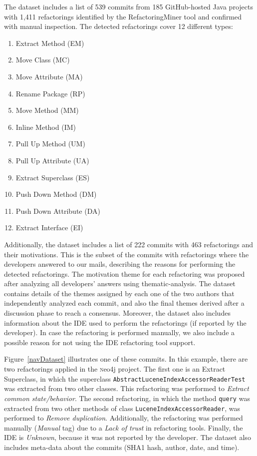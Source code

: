 The dataset includes a list of 539 commits from 185 GitHub-hosted Java projects with 1,411 refactorings identified by the RefactoringMiner tool and confirmed with manual inspection. The detected refactorings cover 12 different types:
\begin{enumerate}
	\item Extract Method (EM)
	\item Move Class (MC)
	\item Move Attribute (MA)
	\item Rename Package (RP)
	\item Move Method (MM)
	\item Inline Method (IM)
	\item Pull Up Method (UM)
	\item Pull Up Attribute (UA)
	\item Extract Superclass (ES)
	\item Push Down Method (DM)
	\item Push Down Attribute (DA)
	\item Extract Interface (EI)
\end{enumerate}


Additionally, the dataset includes a list of 222 commits with 463 refactorings and their motivations.
This is the subset of the commits with refactorings where the developers answered to our mails, describing the reasons for performing the detected refactorings. The motivation theme for each refactoring was proposed after analyzing all developers' answers using thematic-analysis. The dataset contains details of the themes assigned by each one of the two authors that independently analyzed each commit, and also the final themes derived after a discussion phase to reach a consensus.
Moreover, the dataset also includes information about the IDE used to perform the refactorings (if reported by the developer). In case the refactoring is performed manually, we also include a possible reason for not using the IDE refactoring tool support.


Figure~\ref{navDataset} illustrates one of these commits. 
In this example, there are two refactorings applied in the {\textsc neo4j} project. The first one is an {\textsc Extract Superclass}, in which the superclass \texttt{AbstractLuceneIndexAccessorReaderTest} was extracted from two other classes. This refactoring was performed to \emph{Extract common state/behavior}. The second refactoring, in which the method \texttt{query} was extracted from two other methods of class \texttt{LuceneIndexAccessorReader}, was performed to \emph{Remove duplication}. Additionally, the refactoring was performed manually (\emph{Manual} tag) due to a \emph{Lack of trust} in refactoring tools. Finally, the IDE is \emph{Unknown}, because it was not reported by the developer.
The dataset also includes meta-data about the commits (SHA1 hash, author, date, and time).


